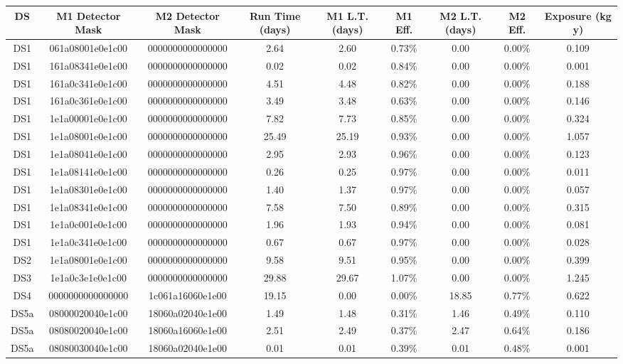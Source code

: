 \begin{tabular}{|c|c c|c|c c|c c|c|}
\hline
  DS & M1 Detector Mask & M2 Detector Mask & Run Time (days) & M1 L.T. (days) & M1 Eff. & M2 L.T. (days) & M2 Eff. & Exposure (kg y) \\
\hline
  DS1 & 061a08001e0e1c00 & 0000000000000000 & 2.64 & 2.60 & 0.73\% & 0.00 & 0.00\% & 0.109 \\
  DS1 & 161a08341e0e1c00 & 0000000000000000 & 0.02 & 0.02 & 0.84\% & 0.00 & 0.00\% & 0.001 \\
  DS1 & 161a0c341e0e1c00 & 0000000000000000 & 4.51 & 4.48 & 0.82\% & 0.00 & 0.00\% & 0.188 \\
  DS1 & 161a0c361e0e1c00 & 0000000000000000 & 3.49 & 3.48 & 0.63\% & 0.00 & 0.00\% & 0.146 \\
  DS1 & 1e1a00001e0e1c00 & 0000000000000000 & 7.82 & 7.73 & 0.85\% & 0.00 & 0.00\% & 0.324 \\
  DS1 & 1e1a08001e0e1c00 & 0000000000000000 & 25.49 & 25.19 & 0.93\% & 0.00 & 0.00\% & 1.057 \\
  DS1 & 1e1a08041e0e1c00 & 0000000000000000 & 2.95 & 2.93 & 0.96\% & 0.00 & 0.00\% & 0.123 \\
  DS1 & 1e1a08141e0e1c00 & 0000000000000000 & 0.26 & 0.25 & 0.97\% & 0.00 & 0.00\% & 0.011 \\
  DS1 & 1e1a08301e0e1c00 & 0000000000000000 & 1.40 & 1.37 & 0.97\% & 0.00 & 0.00\% & 0.057 \\
  DS1 & 1e1a08341e0e1c00 & 0000000000000000 & 7.58 & 7.50 & 0.89\% & 0.00 & 0.00\% & 0.315 \\
  DS1 & 1e1a0c001e0e1c00 & 0000000000000000 & 1.96 & 1.93 & 0.94\% & 0.00 & 0.00\% & 0.081 \\
  DS1 & 1e1a0c341e0e1c00 & 0000000000000000 & 0.67 & 0.67 & 0.97\% & 0.00 & 0.00\% & 0.028 \\
  DS2 & 1e1a08001e0e1c00 & 0000000000000000 & 9.58 & 9.51 & 0.95\% & 0.00 & 0.00\% & 0.399 \\
  DS3 & 1e1a0c3e1e0e1c00 & 0000000000000000 & 29.88 & 29.67 & 1.07\% & 0.00 & 0.00\% & 1.245 \\
  DS4 & 0000000000000000 & 1c061a16060e1e00 & 19.15 & 0.00 & 0.00\% & 18.85 & 0.77\% & 0.622 \\
  DS5a & 08000020040e1c00 & 18060a02040e1e00 & 1.49 & 1.48 & 0.31\% & 1.46 & 0.49\% & 0.110 \\
  DS5a & 08080020040e1c00 & 18060a16060e1e00 & 2.51 & 2.49 & 0.37\% & 2.47 & 0.64\% & 0.186 \\
  DS5a & 08080030040e1c00 & 18060a02040e1e00 & 0.01 & 0.01 & 0.39\% & 0.01 & 0.48\% & 0.001 \\

\end{tabular}
